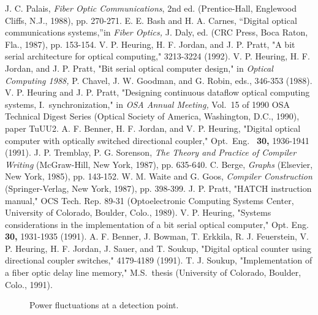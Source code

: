 \begin{references}
 J. C. Palais, {\it Fiber Optic Communications}, 2nd ed.
(Prentice-Hall, Englewood Cliffs, N.J., 1988), pp. 270-271.
 E. E. Bash and H. A. Carnes, ``Digital optical communications
systems,''in {\it Fiber Optics,} J. Daly, ed. (CRC Press, Boca Raton, Fla.,
1987), pp. 153-154.
 V. P. Heuring, H. F. Jordan, and J. P. Pratt, "A bit serial
architecture for optical computing,"  3213-3224 (1992).
 V. P. Heuring, H. F. Jordan, and J. P. Pratt, "Bit serial
optical computer design," in {\it Optical Computing 1988,} P. Chavel, J. 
W. Goodman, and G. Robin, eds.,  346-353 (1988).
 V. P. Heuring and J. P. Pratt, "Designing continuous dataflow
optical computing systems, I.\ synchronization," in {\it OSA Annual
Meeting,} Vol.\ 15 of 1990 OSA Technical Digest Series (Optical Society of
America, Washington, D.C., 1990), paper TuUU2.
 A. F. Benner, H. F. Jordan, and V. P. Heuring, "Digital optical
computer with optically switched directional coupler," Opt.\ Eng.\ {\bf
30,} 1936-1941 (1991).
 J. P. Tremblay, P. G. Sorenson, {\it The Theory and Practice of
Compiler Writing} (McGraw-Hill, New York, 1987), pp. 635-640.
 C. Berge, {\it Graphs} (Elsevier, New York, 1985), pp. 143-152.
 W. M. Waite and G. Goos, {\it Compiler Construction}
(Springer-Verlag, New York, 1987), pp. 398-399.
 J. P. Pratt, "HATCH instruction manual,"  OCS Tech. Rep. 89-31
(Optoelectronic Computing Systems Center, University of Colorado,  Boulder,
Colo., 1989). 
 V. P. Heuring, "Systems considerations in the implementation
of a bit serial optical computer," Opt. Eng. {\bf 30,} 1931-1935 (1991).
 A. F. Benner, J. Bowman, T. Erkkila, R. J. Feuerstein, V. P.
Heuring, H. F. Jordan, J. Sauer, and T. Soukup, "Digital optical counter
using directional coupler switches,"  4179-4189 (1991).
 T. J. Soukup, "Implementation of a fiber optic delay line
memory," M.S.\ thesis (University of Colorado, Boulder, Colo., 1991).
\end{references}
\begin{figure}
\caption{ Power fluctuations at a detection point.} \end{figure}

